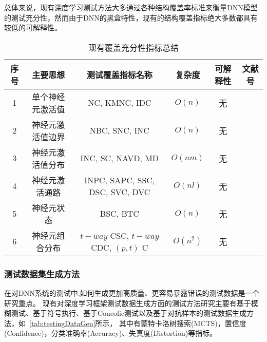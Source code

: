 总体来说，现有深度学习测试方法大多通过各种结构覆盖率标准来衡量DNN模型的测试充分性，然而由于DNN的黑盒特性，现有的结构覆盖指标绝大多数都具有较低的可解释性。


\begin{table}[t]
	\small
	\centering
	\caption{现有覆盖充分性指标总结}
	\label{tab:coverage_criteria}
	\begin{tabular}{cccccc}
		\toprule
		\textbf{序号}\centering & \textbf{主要思想}\centering & \textbf{测试覆盖指标名称}\centering & \textbf{复杂度} & \textbf{可解释性} & \textbf{文献号} \\
		\midrule
		1 & 单个神经元激活值\centering & NC, KMNC, IDC\centering & $O(n)$ & 无 & \cite{ma2018deepgauge,Pei2019DeepXplore,Gerasimou2020Importance} \\
		2 & 神经元激活值边界\centering & NBC, SNC, INC\centering & $O(n)$ & 无 & \cite{ma2018deepgauge} \\
		3 & 神经元激活值分布\centering & INC, SC, NAVD, MD\centering & $O(nm)$ & 无 & \cite{ma2018deepgauge,Kim2019Guiding,Tian2019Testing} \\
		4 & 神经元激活通路\centering & INPC, SAPC, SSC, DSC, SVC, DVC\centering & $O(nl)$ & 无 & \cite{ma2018deepgauge,Wang2019DeepPath,Sun2018Testing} \\
		5 & 神经元状态\centering & BSC, BTC\centering & $O(n)$ & 无 & \cite{Du2018DeepCruiser} \\
		6 & 神经元组合分布\centering & $t-way$ CSC, $t-way$ CDC, $(p,t)$ C\centering & $O(n^2)$ & 无 & \cite{ma2019deepct} \\
		\bottomrule
	\end{tabular}
\end{table}






\subsubsection{测试数据集生成方法}


在对DNN系统的测试中,如何生成更加高质量、更容易暴露错误的测试数据是一个研究重点。
现有对深度学习框架测试数据生成方面的测试方法研究主要有基于模糊测试、基于符号执行、基于Concolic测试以及基于对抗样本的测试数据生成方法，如~\cref{tab:testingDataGen}所示，
其中有蒙特卡洛树搜索(MCTS)，置信度(Confidence)，分类准确率(Accuracy)、失真度(Distortion)等指标。



